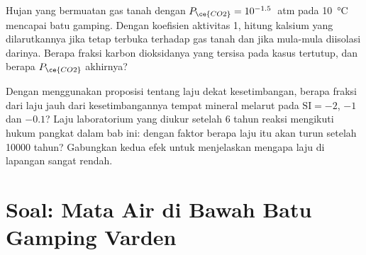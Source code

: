 \begin{exercise}[$\star\star\star$]\label{exo:b3:water-rock-interaction:11}
Hujan yang bermuatan gas tanah dengan $P_{\ce{CO2}} = 10^{-1.5}$~atm pada
\qty{10}{\celsius} mencapai batu gamping. Dengan koefisien aktivitas 1,
hitung kalsium yang dilarutkannya jika tetap terbuka terhadap gas tanah dan jika
mula-mula diisolasi darinya. Berapa fraksi karbon dioksidanya yang tersisa pada
kasus tertutup, dan berapa $P_{\ce{CO2}}$ akhirnya?
\end{exercise}

\begin{exercise}[$\star\star\star$]\label{exo:b3:water-rock-interaction:12}
Dengan menggunakan proposisi tentang laju dekat kesetimbangan, berapa fraksi dari
laju jauh dari kesetimbangannya tempat mineral melarut pada $\mathrm{SI} =
-2$, $-1$ dan $-0.1$? Laju laboratorium yang diukur setelah 6 tahun reaksi
mengikuti hukum pangkat dalam bab ini: dengan faktor berapa laju itu akan turun
setelah \num{10000} tahun? Gabungkan kedua efek untuk menjelaskan mengapa laju di
lapangan sangat rendah.
\end{exercise}

\section{Soal: Mata Air di Bawah Batu Gamping Varden}

